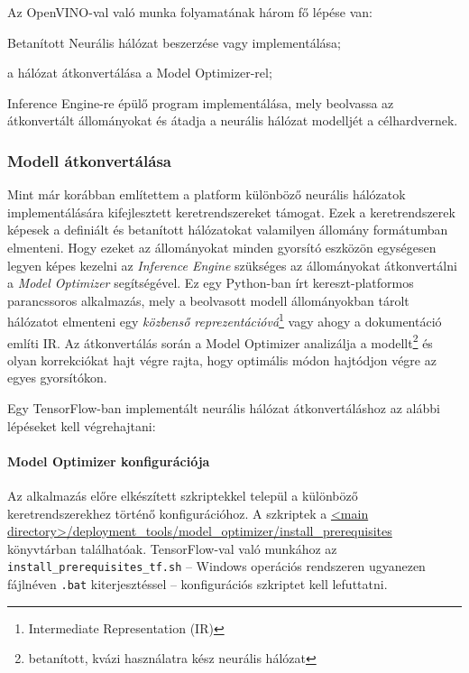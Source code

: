 Az OpenVINO-val való munka folyamatának három fő lépése van:
\begin{enumerate*}[label={\arabic*)}, font=\bfseries]
	\item Betanított Neurális hálózat beszerzése vagy implementálása;
	\item a hálózat átkonvertálása a Model Optimizer-rel;
	\item Inference Engine-re épülő program implementálása, mely beolvassa az átkonvertált állományokat és átadja a neurális hálózat modelljét a célhardvernek.
\end{enumerate*}

\subsubsection{Modell átkonvertálása}
Mint már korábban említettem a platform különböző neurális hálózatok implementálására kifejlesztett keretrendszereket támogat. Ezek a keretrendszerek képesek a definiált és betanított hálózatokat valamilyen állomány formátumban elmenteni. Hogy ezeket az állományokat minden gyorsító eszközön egységesen legyen képes kezelni az \emph{Inference Engine} szükséges az állományokat átkonvertálni a \emph{Model Optimizer} segítségével. Ez egy Python-ban írt kereszt-platformos parancssoros alkalmazás, mely a beolvasott modell állományokban tárolt hálózatot elmenteni egy \emph{közbenső reprezentációvá}\footnote{Intermediate Representation (IR)} vagy ahogy a dokumentáció említi IR. Az átkonvertálás során a Model Optimizer analizálja a modellt\footnote{betanított, kvázi használatra kész neurális hálózat} és olyan korrekciókat hajt végre rajta, hogy optimális módon hajtódjon végre az egyes gyorsítókon. 

Egy TensorFlow-ban implementált neurális hálózat átkonvertáláshoz az alábbi lépéseket kell végrehajtani:
\paragraph*{Model Optimizer konfigurációja}
	Az alkalmazás előre elkészített szkriptekkel települ a különböző keretrendszerekhez történő konfigurációhoz. A szkriptek a \url{<main directory>/deployment_tools/model_optimizer/install_prerequisites} könyvtárban találhatóak. TensorFlow-val való munkához az \verb|install_prerequisites_tf.sh| -- Windows operációs rendszeren ugyanezen fájlnéven \verb|.bat| kiterjesztéssel -- konfigurációs szkriptet kell lefuttatni.

